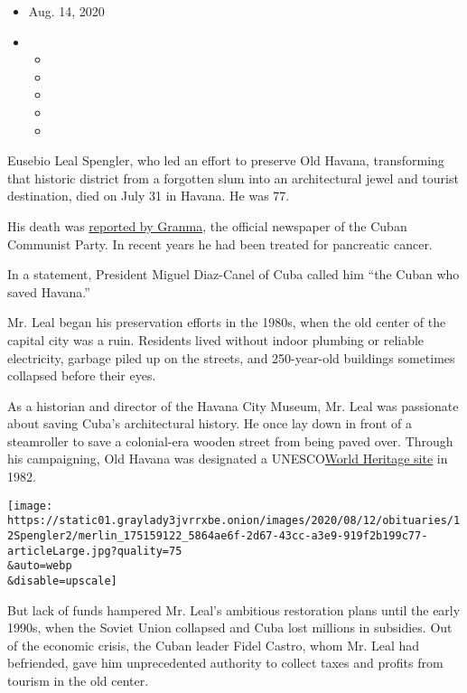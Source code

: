 \begin{itemize}
\item
  Aug. 14, 2020
\item
  \begin{itemize}
  \item
  \item
  \item
  \item
  \item
  \end{itemize}
\end{itemize}

Eusebio Leal Spengler, who led an effort to preserve Old Havana,
transforming that historic district from a forgotten slum into an
architectural jewel and tourist destination, died on July 31 in Havana.
He was 77.

His death was
\href{http://en.granma.cu/cuba/2020-07-31/eusebio-leal-spengler-has-died-forever-yours-dear-historian}{reported
by Granma}, the official newspaper of the Cuban Communist Party. In
recent years he had been treated for pancreatic cancer.

In a statement, President Miguel Diaz-Canel of Cuba called him ``the
Cuban who saved Havana.''

Mr. Leal began his preservation efforts in the 1980s, when the old
center of the capital city was a ruin. Residents lived without indoor
plumbing or reliable electricity, garbage piled up on the streets, and
250-year-old buildings sometimes collapsed before their eyes.

As a historian and director of the Havana City Museum, Mr. Leal was
passionate about saving Cuba's architectural history. He once lay down
in front of a steamroller to save a colonial-era wooden street from
being paved over. Through his campaigning, Old Havana was designated a
UNESCO\href{https://whc.unesco.org/en/list/}{World Heritage site} in
1982.

\texttt{[image: https://static01.graylady3jvrrxbe.onion/images/2020/08/12/obituaries/12Spengler2/merlin\_175159122\_5864ae6f-2d67-43cc-a3e9-919f2b199c77-articleLarge.jpg?quality=75\\\&auto=webp\\\&disable=upscale]}

But lack of funds hampered Mr. Leal's ambitious restoration plans until
the early 1990s, when the Soviet Union collapsed and Cuba lost millions
in subsidies. Out of the economic crisis, the Cuban leader Fidel Castro,
whom Mr. Leal had befriended, gave him unprecedented authority to
collect taxes and profits from tourism in the old center.

